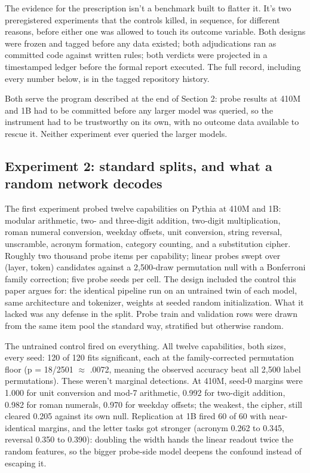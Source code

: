 The evidence for the prescription isn't a benchmark built to flatter it.
It's two preregistered experiments that the controls killed, in sequence,
for different reasons, before either one was allowed to touch its outcome
variable. Both designs were frozen and tagged before any data existed;
both adjudications ran as committed code against written rules; both
verdicts were projected in a timestamped ledger before the formal report
executed. The full record, including every number below, is in the tagged
repository history.

Both serve the program described at the end of Section 2: probe
results at 410M and 1B had to be committed before any larger model was
queried, so the instrument had to be trustworthy on its own, with no
outcome data available to rescue it. Neither experiment ever queried
the larger models.

\subsection{Experiment 2: standard splits, and what a random network decodes}\label{experiment-2-standard-splits-and-what-a-random-network-decodes}

The first experiment probed twelve capabilities on Pythia at 410M and 1B:
modular arithmetic, two- and three-digit addition, two-digit
multiplication, roman numeral conversion, weekday offsets, unit
conversion, string reversal, unscramble, acronym formation, category
counting, and a substitution cipher. Roughly
two thousand probe items per capability; linear probes swept over
(layer, token) candidates against a 2,500-draw permutation null with a
Bonferroni family correction; five probe seeds per cell. The design
included the control this paper argues for: the identical pipeline run on
an untrained twin of each model, same architecture and tokenizer, weights
at seeded random initialization. What it lacked was any defense in the
split. Probe train and validation rows were drawn from the same item pool
the standard way, stratified but otherwise random.

The untrained control fired on everything. All twelve capabilities, both
sizes, every seed: 120 of 120 fits significant, each at the
family-corrected permutation floor (p = 18/2501 $\approx$ .0072, meaning the
observed accuracy beat all 2,500 label permutations). These weren't
marginal detections. At 410M, seed-0 margins were 1.000 for unit
conversion and mod-7 arithmetic, 0.992 for two-digit addition, 0.982 for
roman numerals, 0.970 for weekday offsets; the weakest, the cipher, still
cleared 0.205 against its own null. Replication at 1B fired 60 of 60 with
near-identical margins, and the letter tasks got stronger (acronym 0.262
to 0.345, reversal 0.350 to 0.390): doubling the width hands the linear
readout twice the random features, so the bigger probe-side model deepens
the confound instead of escaping it.

